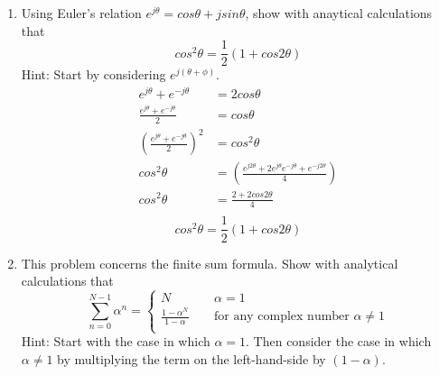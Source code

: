 \documentclass{article}
\begin{document}
\begin{enumerate}
    \newpage
    \item Using Euler's relation $e^{j\theta} = cos\theta +jsin\theta$, show with anaytical calculations that
    \begin{equation}
        cos^2\theta = \frac{1}{2}(1+cos2\theta)
    \end{equation}
    Hint: Start by considering $e^{j(\theta +\phi)}$.
    \begin{align}
        e^{j\theta} + e^{-j\theta} &= 2cos\theta\\
        \frac{e^{j\theta} + e^{-j\theta}}{2}&=cos\theta\\
        \left(\frac{e^{j\theta} + e^{-j\theta}}{2}\right)^2&=cos^2\theta\\
        cos^2\theta &=  \left(\frac{e^{j2\theta} + 2e^{j\theta }e^{-j\theta } + e^{-j2\theta }}{4}\right)\\
        cos^2\theta &= \frac{2+2cos2\theta}{4}\\
        \end{align}
        \begin{equation}
            \boxed{cos^2\theta = \frac{1}{2}(1+cos2\theta)}    
        \end{equation}
    \item This problem concerns the finite sum formula. Show with analytical calculations that 
    \begin{equation}
        \sum_{n=0}^{N-1}\alpha^n = \begin{cases}
          N \quad & \, \alpha = 1\\
          \frac{1-\alpha^N}{1-\alpha}\quad & \,\text{for any complex number }  \alpha \ne 1 \\
     \end{cases}
    \end{equation}
    Hint: Start with the case in which $\alpha = 1$. Then consider the case in which $\alpha \ne 1$ by multiplying the term on the left-hand-side by $(1-\alpha)$.
    

\end{enumerate}
\end{document}
